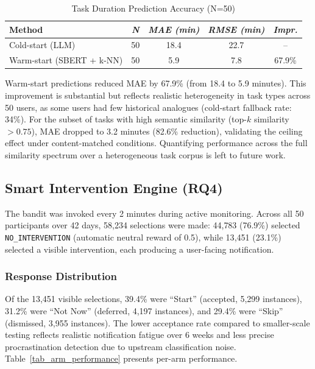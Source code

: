 \documentclass[conference]{IEEEtran}
\begin{document}
\begin{table}[htbp]
\caption{Task Duration Prediction Accuracy (N=50)}
\label{tab_duration_accuracy}
\begin{center}
\begin{tabular}{|p{2.5cm}|c|c|c|c|}
\hline
\textbf{Method} & \textbf{\textit{N}} & \textbf{\textit{MAE (min)}} & \textbf{\textit{RMSE (min)}} & \textbf{\textit{Impr.}} \\
\hline
Cold-start (LLM) & 50 & 18.4 & 22.7 & -- \\
\hline
Warm-start (SBERT + k-NN) & 50 & 5.9 & 7.8 & 67.9\% \\
\hline
\end{tabular}
\end{center}
\end{table}

Warm-start predictions reduced MAE by 67.9\% (from 18.4 to 5.9 minutes). This improvement is substantial but reflects realistic heterogeneity in task types across 50 users, as some users had few historical analogues (cold-start fallback rate: 34\%). For the subset of tasks with high semantic similarity (top-$k$ similarity $> 0.75$), MAE dropped to 3.2 minutes (82.6\% reduction), validating the ceiling effect under content-matched conditions. Quantifying performance across the full similarity spectrum over a heterogeneous task corpus is left to future work.

\subsection{Smart Intervention Engine (RQ4)}

The bandit was invoked every 2 minutes during active monitoring. Across all 50 participants over 42 days, 58{,}234 selections were made: 44{,}783 (76.9\%) selected \texttt{NO\_INTERVENTION} (automatic neutral reward of 0.5), while 13{,}451 (23.1\%) selected a visible intervention, each producing a user-facing notification.

\subsubsection{Response Distribution}
Of the 13{,}451 visible selections, 39.4\% were ``Start'' (accepted, 5{,}299 instances), 31.2\% were ``Not Now'' (deferred, 4{,}197 instances), and 29.4\% were ``Skip'' (dismissed, 3{,}955 instances). The lower acceptance rate compared to smaller-scale testing reflects realistic notification fatigue over 6 weeks and less precise procrastination detection due to upstream classification noise. Table~\ref{tab_arm_performance} presents per-arm performance.
\end{document}
